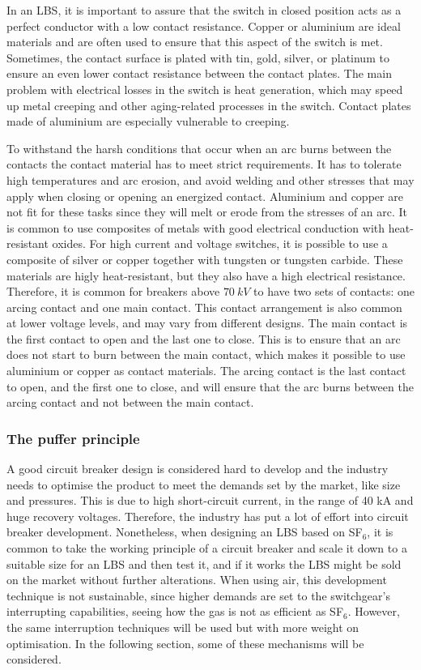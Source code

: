 \documentclass[10pt,a4paper,twoside]{article}
\begin{document}
In an LBS, it is important to assure that the switch in closed position acts as a perfect conductor with a low contact resistance. Copper or aluminium are ideal materials and are often used to ensure that this aspect of the switch is met. Sometimes, the contact surface is plated with tin, gold, silver, or platinum to ensure an even lower contact resistance between the contact plates. The main problem with electrical losses in the switch is heat generation, which may speed up metal creeping and other aging-related processes in the switch. Contact plates made of aluminium are especially vulnerable to creeping.
 
To withstand the harsh conditions that occur when an arc burns between the contacts the contact material has to meet strict requirements. It has to tolerate high temperatures and arc erosion, and avoid welding and other stresses that may apply when closing or opening an energized contact. Aluminium and copper are not fit for these tasks since they will melt or erode from the stresses of an arc. It is common to use composites of metals with good electrical conduction with heat-resistant oxides. For high current and voltage switches, it is possible to use a composite of silver or copper together with tungsten or tungsten carbide. These materials are higly heat-resistant, but they also have a high electrical resistance. Therefore, it is common for breakers above $70 \ kV$ to have two sets of contacts: one arcing contact and one main contact. This contact arrangement is  also common at lower voltage levels, and may vary from different designs. The main contact is the first contact to open and the last one to close. This is to ensure that an arc does not start to burn between the main contact, which makes it possible to use aluminium or copper as contact materials. The arcing contact is the last contact to open, and the first one to close, and will ensure that the arc burns between the arcing contact and not between the main contact.

\subsubsection{The puffer principle}
A good circuit breaker design is considered hard to develop and the industry needs to optimise the product to meet the demands set by the market, like size and pressures. This is due to high short-circuit current, in the range of 40 kA and huge recovery voltages. Therefore, the industry has put a lot of effort into circuit breaker development. Nonetheless, when designing an LBS based on SF$_6$, it is common to take the working principle of a circuit breaker and scale it down to a suitable size for an LBS and then test it, and if it works the LBS might be sold on the market without further alterations. When using air, this development technique is not sustainable, since higher demands are set to the switchgear's interrupting capabilities, seeing how the gas is not as efficient as SF$_6$. However, the same interruption techniques will be used but with more weight on optimisation. In the following section, some of these mechanisms will be considered. 
\end{document}

